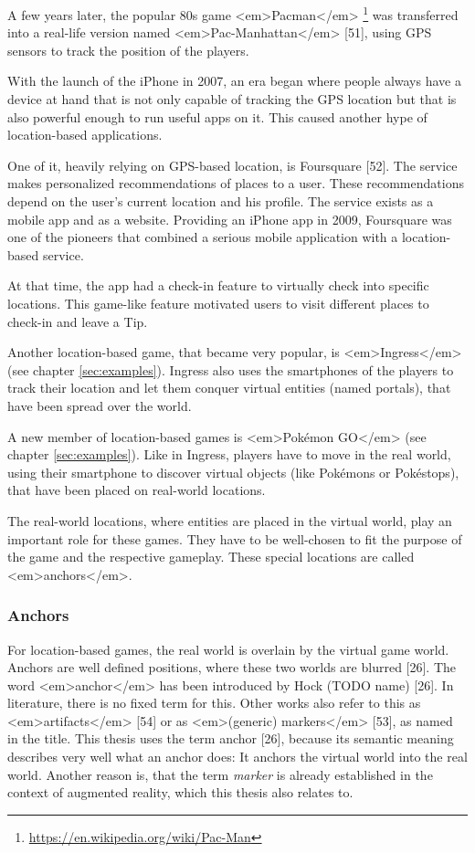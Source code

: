 A few years later, the popular 80s game <em>Pacman</em> \footnote{\url{https://en.wikipedia.org/wiki/Pac-Man}} was transferred into a real-life version named <em>Pac-Manhattan</em> [51], using GPS sensors to track the position of the players.

With the launch of the iPhone in 2007, an era began where people always have a device at hand that is not only capable of tracking the GPS location but that is also powerful enough to run useful apps on it. This caused another hype of location-based applications.

One of it, heavily relying on GPS-based location, is Foursquare [52]. The service makes personalized recommendations of places to a user. These recommendations depend on the user’s current location and his profile. The service exists as a mobile app and as a website. Providing an iPhone app in 2009, Foursquare was one of the pioneers that combined a serious mobile application with a location-based service.

At that time, the app had a check-in feature to virtually check into specific locations. This game-like feature motivated users to visit different places to check-in and leave a Tip.

Another location-based game, that became very popular, is <em>Ingress</em> (see chapter \ref{sec:examples}). Ingress also uses the smartphones of the players to track their location and let them conquer virtual entities (named portals), that have been spread over the world.

A new member of location-based games is <em>Pokémon GO</em> (see chapter \ref{sec:examples}). Like in Ingress, players have to move in the real world, using their smartphone to discover virtual objects (like Pokémons or Pokéstops), that have been placed on real-world locations.

The real-world locations, where entities are placed in the virtual world, play an important role for these games. They have to be well-chosen to fit the purpose of the game and the respective gameplay. These special locations are called <em>anchors</em>.

\subsubsection{Anchors}\label{sec:anchorsStateOfTheArt}
For location-based games, the real world is overlain by the virtual game world. Anchors are well defined positions, where these two worlds are blurred [26]. The word <em>anchor</em> has been introduced by Hock (TODO name) [26]. In literature, there is no fixed term for this. Other works also refer to this as <em>artifacts</em> [54] or as <em>(generic) markers</em> [53], as named in the title. This thesis uses the term anchor [26], because its semantic meaning describes very well what an anchor does: It anchors the virtual world into the real world. Another reason is, that the term \emph{marker} is already established in the context of augmented reality, which this thesis also relates to.

